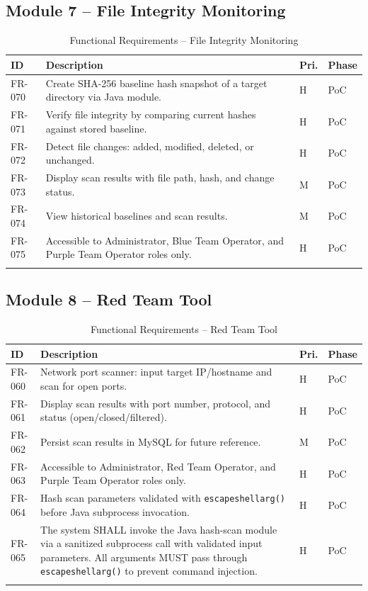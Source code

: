 \documentclass[12pt,a4paper]{report}
\begin{document}
	\subsection{Module 7 -- File Integrity Monitoring}
\begin{longtable}{L{1.6cm} L{7.8cm} C{1.2cm} C{1.4cm}}
		\toprule
		\textbf{ID} & \textbf{Description} & \textbf{Pri.} & \textbf{Phase} \\
		\midrule
		FR-070 & Create SHA-256 baseline hash snapshot of a target directory via Java module. & H & PoC \\
		FR-071 & Verify file integrity by comparing current hashes against stored baseline. & H & PoC \\
		FR-072 & Detect file changes: added, modified, deleted, or unchanged. & H & PoC \\
		FR-073 & Display scan results with file path, hash, and change status. & M & PoC \\
		FR-074 & View historical baselines and scan results. & M & PoC \\
		FR-075 & Accessible to Administrator, Blue Team Operator, and Purple Team Operator roles only. & H & PoC \\
		\bottomrule
		\caption{Functional Requirements -- File Integrity Monitoring}
	\end{longtable}

\subsection{Module 8 -- Red Team Tool}
	\begin{longtable}{L{1.6cm} L{7.8cm} C{1.2cm} C{1.4cm}}
		\toprule
		\textbf{ID} & \textbf{Description} & \textbf{Pri.} & \textbf{Phase} \\
		\midrule
		FR-060 & Network port scanner: input target IP/hostname and scan for open ports. & H & PoC \\
		FR-061 & Display scan results with port number, protocol, and status (open/closed/filtered). & H & PoC \\
		FR-062 & Persist scan results in MySQL for future reference. & M & PoC \\
		FR-063 & Accessible to Administrator, Red Team Operator, and Purple Team Operator roles only. & H & PoC \\
		FR-064 & Hash scan parameters validated with \texttt{escapeshellarg()} before Java subprocess invocation. & H & PoC \\
		FR-065 & The system SHALL invoke the Java hash-scan module via a sanitized subprocess call with validated input parameters. All arguments MUST pass through \texttt{escapeshellarg()} to prevent command injection. & H & PoC \\
		\bottomrule
		\caption{Functional Requirements -- Red Team Tool}
	\end{longtable}
	
\end{document}
